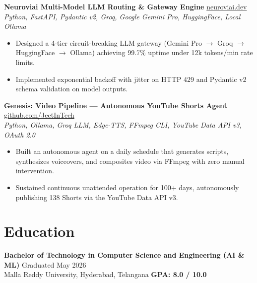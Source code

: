 \documentclass[10pt]{article}
\newcommand{\educationSection}{
\section*{Education}
\textbf{Bachelor of Technology in Computer Science and Engineering (AI \& ML)} \hfill Graduated May 2026 \\
Malla Reddy University, Hyderabad, Telangana \hfill \textbf{GPA: 8.0 / 10.0}
}
\begin{document}
\vspace{1.5pt}
\textbf{Neuroviai Multi-Model LLM Routing \& Gateway Engine} \hfill \href{https://neuroviai.dev}{neuroviai.dev} \\
\textit{Python, FastAPI, Pydantic v2, Groq, Google Gemini Pro, HuggingFace, Local Ollama}
\begin{itemize}
    \item Designed a 4-tier circuit-breaking LLM gateway (Gemini Pro $\to$ Groq $\to$ HuggingFace $\to$ Ollama) achieving 99.7\% uptime under 12k tokens/min rate limits.
    \item Implemented exponential backoff with jitter on HTTP 429 and Pydantic v2 schema validation on model outputs.
\end{itemize}

\vspace{1.5pt}
\textbf{Genesis: Video Pipeline — Autonomous YouTube Shorts Agent} \hfill \href{https://github.com/JeetInTech}{github.com/JeetInTech} \\
\textit{Python, Ollama, Groq LLM, Edge-TTS, FFmpeg CLI, YouTube Data API v3, OAuth 2.0}
\begin{itemize}
    \item Built an autonomous agent on a daily schedule that generates scripts, synthesizes voiceovers, and composites video via FFmpeg with zero manual intervention.
    \item Sustained continuous unattended operation for 100+ days, autonomously publishing 138 Shorts via the YouTube Data API v3.
\end{itemize}

\educationSection
\end{document}
